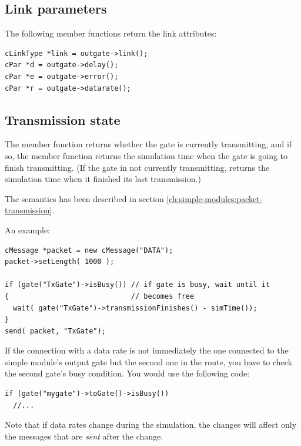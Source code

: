 \subsection{Link parameters}


The following member functions return the link attributes:

\begin{verbatim}
cLinkType *link = outgate->link();
cPar *d = outgate->delay();
cPar *e = outgate->error();
cPar *r = outgate->datarate();
\end{verbatim}


\subsection{Transmission state}
\label{ch:simple-modules:cgate-transmission-state}

The  member function returns whether the gate
is currently transmitting, and if so, the
 member function
returns the simulation time when the gate is going to finish
transmitting. (If the gate in not currently transmitting,
 returns the simulation time
when it finished its last transmission.)

The semantics has been described in section
\ref{ch:simple-modules:packet-transmission}.

An example:

\begin{verbatim}
cMessage *packet = new cMessage("DATA");
packet->setLength( 1000 );

if (gate("TxGate")->isBusy()) // if gate is busy, wait until it
{                             // becomes free
  wait( gate("TxGate")->transmissionFinishes() - simTime());
}
send( packet, "TxGate");
\end{verbatim}

If the connection with a data rate is not immediately the one
connected to the simple module's output gate but
the second one in the route, you have to check the second gate's busy
condition.  You would use the following code:

\begin{verbatim}
if (gate("mygate")->toGate()->isBusy())
  //...
\end{verbatim}

Note that if data rates change during the
simulation, the changes will affect only the messages that are
\textit{sent} after the change.



